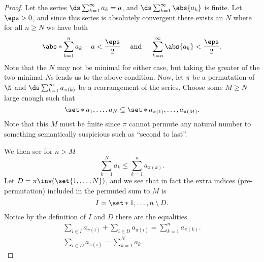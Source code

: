 \documentclass{article}
\begin{document}
\begin{enumerate}
        \begin{proof}
          Let the series $\ds\sum_{k = 1}^{\infty}a_{k} = a$, and $\ds\sum_{k = 1}^{\infty}\abs{a_{k}}$ is finite.
          Let $\eps > 0$, and since this series is absolutely convergent there exists an $N$ where for all $n \ge N$ we have both
          \begin{equation}\label{abs-conv-defn}
            \abs*{\sum_{k = 1}^{n}a_{k} - a} < \frac{\eps}{2} \quad \textrm{ and } \quad \sum_{k = n}^{\infty}\abs{a_{k}} < \frac{\eps}{2}.
          \end{equation}
          Note that the $N$ may not be minimal for either case, but taking the greater of the two minimal $N$s lends us to the
          above condition. Now, let $\pi$ be a permutation of $\N$ and $\ds\sum_{k = 1}^{\infty}a_{\pi(k)}$ be a rearrangement of the series.
          Choose some $M \ge N$ large enough such that
          \[ \set*{a_{1}, \ldots, a_{N}} \subseteq \set*{a_{\pi(1)}, \ldots, a_{\pi(M)}}. \]
          Note that this $M$ must be finite since $\pi$ cannot permute any natural number to something semantically
          suspicious such as ``second to last''.

          We then see for $n > M$
          \begin{equation}\label{ineq-permuted-to-M} \sum_{k = 1}^{N}a_{k} \le \sum_{k = 1}^{n}a_{\pi(k)}. \end{equation}
          Let $D = \pi\inv(\set{1, \ldots, N})$, and we see that in fact the extra indices (pre-permutation)
          included in the permuted sum to $M$ is
          \[ I = \set*{1, \ldots, n} \setminus D. \]
          Notice by the definition of $I$ and $D$ there are the equalities
          \begin{align}
            \sum_{i \in I}a_{\pi(i)} + \sum_{i \in D}a_{\pi(i)} = \sum_{k = 1}^{n}a_{\pi(k)}. \label{split-permuted-full-sum}\\
            \sum_{i \in D}a_{\pi(i)} = \sum_{k = 1}^{N}a_{k}. \label{sum-over-D-eq-up-to-N}
          \end{align}


\end{proof}
\end{enumerate}
\end{document}
